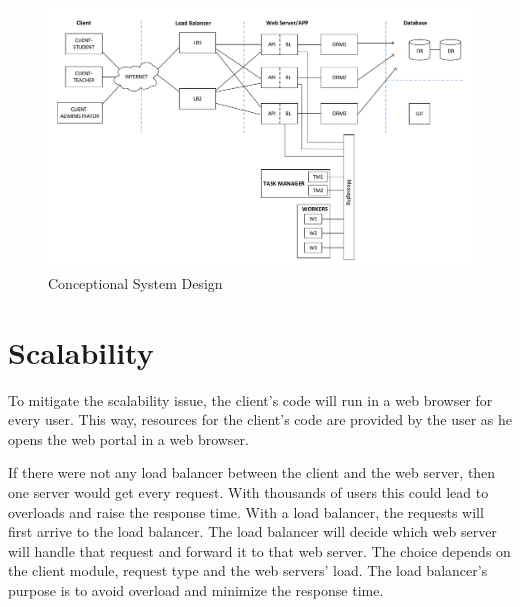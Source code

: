 \begin{landscape}
	\begin{figure}[!htbp]
		\centering
		\includegraphics[height=0.95\textwidth]{figures/atfogo_rendszerterv_teljes.pdf}
		\caption[Conceptional System Design]{Conceptional System Design}
		\label{fig:conceptional-system-design}
	\end{figure}
\end{landscape}

\section{Scalability}\label{scalability}

To mitigate the scalability issue, the client's code will run in a web browser for every user. This way, resources for the client's code are provided by the user as he opens the web portal in a web browser.
 
If there were not any load balancer between the client and the web server, then one server would get every request. With thousands of users this could lead to overloads and raise the response time. With a load balancer, the requests will first arrive to the load balancer. The load balancer will decide which web server will handle that request and forward it to that web server. The choice depends on the client module, request type and the web servers' load. The load balancer's purpose is to avoid overload and minimize the response time.


